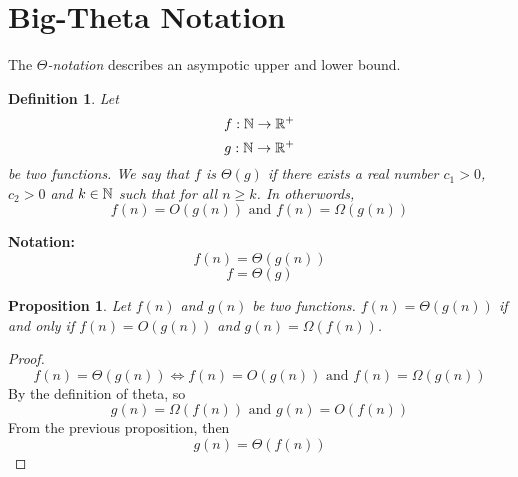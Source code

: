 \documentclass[openany]{report}
\newtheorem{definition}{Definition}[section]
\newtheorem{prop}{Proposition}[section]
\begin{document}
\section{Big-Theta Notation}
The \emph{$\Theta$-notation} describes an asympotic upper and lower bound.
\begin{definition}
    Let 
    \[f: \mathbb{N} \rightarrow \mathbb{R}^+\]
    \[g: \mathbb{N} \rightarrow \mathbb{R}^+\]
    be two functions. We say that $f$ is $\Theta(g)$ if there exists a real number $c_1 > 0$, $c_2 > 0$ and $k \in \mathbb{N}$ such that for all $n \geq k$. In otherwords,
    \[f(n) = O(g(n)) \text{ and } f(n) = \Omega(g(n))\]
\end{definition}
\textbf{Notation:} 
\[f(n) = \Theta(g(n))\]
\[f = \Theta(g)\]
\begin{prop}
    Let $f(n)$ and $g(n)$ be two functions. $f(n) = \Theta(g(n))$ if and only if $f(n) = O(g(n))$ and $g(n) = \Omega(f(n))$.
\end{prop}
\begin{proof}
    \[f(n) = \Theta(g(n)) \iff f(n) = O(g(n)) \text{ and } f(n) = \Omega(g(n))\]
    By the definition of theta, so
    \[g(n) = \Omega(f(n)) \text{ and } g(n) = O(f(n))\]
    From the previous proposition, then 
    \[g(n) = \Theta(f(n))\]
\end{proof}

\end{document}
